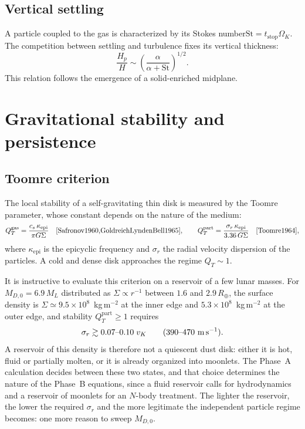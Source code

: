 \documentclass[11pt,a4paper,openany]{report}
\newcommand{\Rt}{R_{\oplus}}
\begin{document}
\subsection{Vertical settling}

A particle coupled to the gas is characterized by its Stokes number$\mathrm{St}=t_{\mathrm{stop}}\Omega_K$. The competition between settling and turbulence fixes its
vertical thickness:
\begin{equation}
\frac{H_p}{H}\sim\left(\frac{\alpha}{\alpha+\mathrm{St}}\right)^{1/2}.
\label{eq:Hp}
\end{equation}
This relation follows the emergence of a solid-enriched midplane.

\section{Gravitational stability and persistence}
\subsection{Toomre criterion}

The local stability of a self-gravitating thin disk is measured by the Toomre parameter, whose
constant depends on the nature of the medium:
\begin{equation}
Q_T^{\mathrm{gas}}=\frac{c_s\,\kappa_{\mathrm{epi}}}{\pi G\Sigma}
\quad\text{\cite{Safronov1960,GoldreichLyndenBell1965}},
\qquad
Q_T^{\mathrm{part}}=\frac{\sigma_r\,\kappa_{\mathrm{epi}}}{3.36\,G\Sigma}
\quad\text{\cite{Toomre1964}},
\label{eq:Toomre}
\end{equation}
where $\kappa_{\mathrm{epi}}$ is the epicyclic frequency and $\sigma_r$ the radial velocity
dispersion of the particles. A cold and dense disk approaches the regime $Q_T\sim1$.

It is instructive to evaluate this criterion on a reservoir of a few lunar masses. For
$M_{D,0}=6.9\,M_L$ distributed as $\Sigma\propto r^{-1}$ between $1.6$ and $2.9\,\Rt$, the surface
density is $\Sigma\simeq9.5\times10^{8}$~kg\,m$^{-2}$ at the inner edge and
$5.3\times10^{8}$~kg\,m$^{-2}$ at the outer edge, and stability $Q_T^{\mathrm{part}}\ge1$ requires
\begin{equation}
\sigma_r\gtrsim0.07\text{--}0.10\;v_K\qquad(390\text{--}470\ \text{m\,s}^{-1}).
\label{eq:sigmar-reservoir}
\end{equation}
A reservoir of this density is therefore not a quiescent dust disk: either it is hot, fluid or
partially molten, or it is already organized into moonlets. The Phase~A calculation decides between
these two states, and that choice determines the nature of the Phase~B equations, since a fluid
reservoir calls for hydrodynamics and a reservoir of moonlets for an $N$-body treatment. The
lighter the reservoir, the lower the required $\sigma_r$ and the more legitimate the independent
particle regime becomes: one more reason to sweep $M_{D,0}$.
\end{document}
